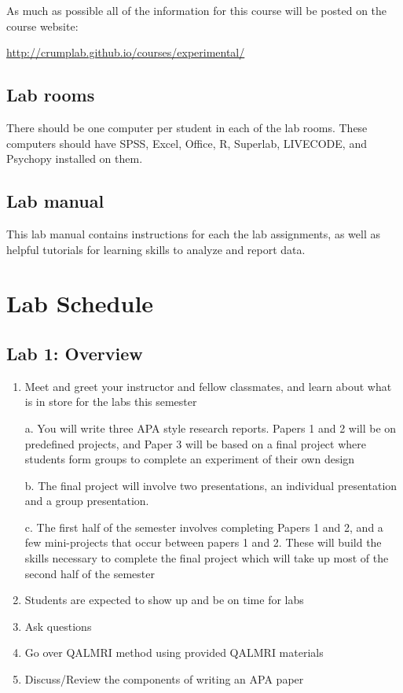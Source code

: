 As much as possible all of the information for this course will be posted on the course website:

\url{http://crumplab.github.io/courses/experimental/}

\subsection{Lab rooms} 

There should be one computer per student in each of the lab rooms. These computers should have SPSS, Excel, Office, R, Superlab, LIVECODE, and Psychopy installed on them. 

\subsection{Lab manual} 

This lab manual contains instructions for each the lab assignments, as well as helpful tutorials for learning skills to analyze and report data.

\section{Lab Schedule}

\subsection{Lab 1: Overview}
\begin{enumerate}
\item Meet and greet your instructor and fellow classmates, and learn about what is in store for the labs this semester	

a.	You will write three APA style research reports. Papers 1 and 2 will be on predefined projects, and Paper 3 will be based on a final project where students form groups to complete an experiment of their own design

b.	The final project will involve two presentations, an individual presentation and a group presentation. 

c.	The first half of the semester involves completing Papers 1 and 2, and a few mini-projects that occur between papers 1 and 2. These will build the skills necessary to complete the final project which will take up most of the second half of the semester
\item	Students are expected to show up and be on time for labs
\item	Ask questions
%
%
%
\item	Go over QALMRI method using provided QALMRI materials
\item	Discuss/Review the components of writing an APA paper
\end{enumerate}

